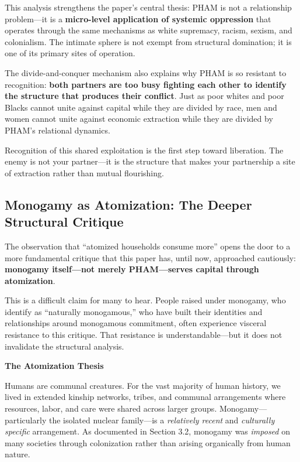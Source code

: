 \documentclass[12pt,openany]{book}
\numberwithin{equation}{chapter}
\begin{document}
This analysis strengthens the paper's central thesis: PHAM is not a relationship problem---it is a \textbf{micro-level application of systemic oppression} that operates through the same mechanisms as white supremacy, racism, sexism, and colonialism. The intimate sphere is not exempt from structural domination; it is one of its primary sites of operation.

The divide-and-conquer mechanism also explains why PHAM is so resistant to recognition: \textbf{both partners are too busy fighting each other to identify the structure that produces their conflict}. Just as poor whites and poor Blacks cannot unite against capital while they are divided by race, men and women cannot unite against economic extraction while they are divided by PHAM's relational dynamics.

Recognition of this shared exploitation is the first step toward liberation. The enemy is not your partner---it is the structure that makes your partnership a site of extraction rather than mutual flourishing.

\subsection{Monogamy as Atomization: The Deeper Structural Critique}

The observation that ``atomized households consume more'' opens the door to a more fundamental critique that this paper has, until now, approached cautiously: \textbf{monogamy itself---not merely PHAM---serves capital through atomization}.

This is a difficult claim for many to hear. People raised under monogamy, who identify as ``naturally monogamous,'' who have built their identities and relationships around monogamous commitment, often experience visceral resistance to this critique. That resistance is understandable---but it does not invalidate the structural analysis.

\textbf{The Atomization Thesis}

Humans are communal creatures. For the vast majority of human history, we lived in extended kinship networks, tribes, and communal arrangements where resources, labor, and care were shared across larger groups. Monogamy---particularly the isolated nuclear family---is a \textit{relatively recent} and \textit{culturally specific} arrangement. As documented in Section 3.2, monogamy was \textit{imposed} on many societies through colonization rather than arising organically from human nature.
\end{document}
